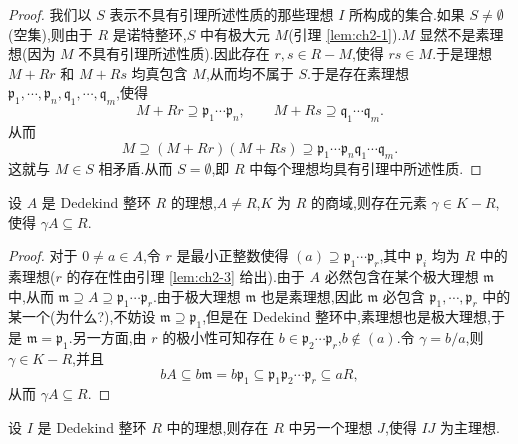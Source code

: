 \begin{proof}
我们以 $S$ 表示不具有引理所述性质的那些理想 $I$ 所构成的集合.如果 $S\neq\emptyset$(空集),则由于 $R$ 是诺特整环,$S$ 中有极大元 $M$(引理 \ref{lem:ch2-1}).$M$ 显然不是素理想(因为 $M$ 不具有引理所述性质).因此存在 $r,s\in R-M$,使得 $rs\in M$.于是理想 $M+Rr$ 和 $M+Rs$ 均真包含 $M$,从而均不属于 $S$.于是存在素理想 $\mathfrak{p}_1,\cdots,\mathfrak{p}_n,\mathfrak{q}_1,\cdots,\mathfrak{q}_m$,使得
\[
  M+Rr\supseteq\mathfrak{p}_1\cdots\mathfrak{p}_n,\qquad
  M+Rs\supseteq\mathfrak{q}_1\cdots\mathfrak{q}_m.
\]
从而
\[
  M\supseteq(M+Rr)(M+Rs)\supseteq\mathfrak{p}_1\cdots\mathfrak{p}_n\mathfrak{q}_1\cdots\mathfrak{q}_m.
\]
这就与 $M\in S$ 相矛盾.从而 $S=\emptyset$,即 $R$ 中每个理想均具有引理中所述性质.
\end{proof}

\begin{lemma}\label{lem:ch2-4}
设 $A$ 是 Dedekind 整环 $R$ 的理想,$A\neq R$,$K$ 为 $R$ 的商域,则存在元素 $\gamma\in K-R$,使得 $\gamma A\subseteq R$.
\end{lemma}

\begin{proof}
对于 $0\neq a\in A$,令 $r$ 是最小正整数使得 $(a)\supseteq\mathfrak{p}_1\cdots\mathfrak{p}_r$,其中 $\mathfrak{p}_i$ 均为 $R$ 中的素理想($r$ 的存在性由引理 \ref{lem:ch2-3} 给出).由于 $A$ 必然包含在某个极大理想 $\mathfrak{m}$ 中,从而 $\mathfrak{m}\supseteq A\supseteq\mathfrak{p}_1\cdots\mathfrak{p}_r$.由于极大理想 $\mathfrak{m}$ 也是素理想,因此 $\mathfrak{m}$ 必包含 $\mathfrak{p}_1,\cdots,\mathfrak{p}_r$ 中的某一个(为什么?),不妨设 $\mathfrak{m}\supseteq\mathfrak{p}_1$,但是在 Dedekind 整环中,素理想也是极大理想,于是 $\mathfrak{m}=\mathfrak{p}_1$.另一方面,由 $r$ 的极小性可知存在 $b\in\mathfrak{p}_2\cdots\mathfrak{p}_r$,$b\notin(a)$.令 $\gamma=b/a$,则 $\gamma\in K-R$,并且
\[
  bA\subseteq b\mathfrak{m}=b\mathfrak{p}_1\subseteq\mathfrak{p}_1\mathfrak{p}_2\cdots\mathfrak{p}_r\subseteq aR,
\]
从而 $\gamma A\subseteq R$.
\end{proof}

\begin{lemma}\label{lem:ch2-5}
设 $I$ 是 Dedekind 整环 $R$ 中的理想,则存在 $R$ 中另一个理想 $J$,使得 $IJ$ 为主理想.
\end{lemma}

